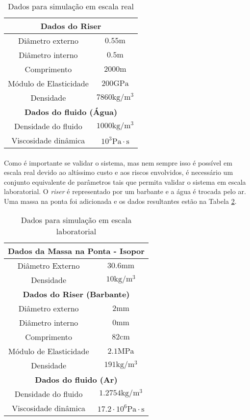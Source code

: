 \begin{table}[!ht]
\centering
\caption{Dados para simulação em escala real\label{escalaReal} \cite{redytton}}
	\begin{tabular}{|c|c|}
	\hline
		\multicolumn{2}{|c|}{\textbf{Dados do Riser}}\\ \hline
		Diâmetro externo & $0.55\mathrm{m}$\\ \hline
		Diâmetro interno & $0.5\mathrm{m}$ \\ \hline
		Comprimento & $2000\mathrm{m}$ \\ \hline
		Módulo de Elasticidade & $200 \mathrm{GPa}$\\ \hline
		Densidade &  $7860\mathrm{kg}/\mathrm{m}^3$\\ \hline
		\multicolumn{2}{|c|}{\textbf{Dados do fluido (Água)}}\\ \hline
		Densidade do fluido &  $1000\mathrm{kg}/\mathrm{m}^3$\\ \hline
		Viscosidade dinâmica & $10^3 \mathrm{Pa}\cdot \mathrm{s}$ \\ \hline
	\end{tabular}
\end{table}

\paragraph{}Como é importante se validar o sistema, mas nem sempre isso é possível em escala real devido ao altíssimo custo e aos riscos envolvidos, é necessário um conjunto equivalente de parâmetros tais que permita validar o sistema em escala laboratorial. O \textit{riser} é representado por um barbante e a água é trocada pelo ar. Uma massa na ponta foi adicionada e os dados resultantes estão na Tabela \ref{escalaLaboratorial}.

\begin{table}[!ht]
\centering
\caption{Dados para simulação em escala laboratorial\label{escalaLaboratorial}}
	\begin{tabular}{|c|c|}
	\hline
		\multicolumn{2}{|c|}{\textbf{Dados da Massa na Ponta - Isopor}} \\ \hline
		Diâmetro Externo & $30.6\mathrm{mm}$\\ \hline
		Densidade & $10\mathrm{kg}/\mathrm{m}^3$ \\ \hline
		\multicolumn{2}{|c|}{\textbf{Dados do Riser (Barbante)}}\\ \hline
		Diâmetro externo & $2\mathrm{mm}$\\ \hline
		Diâmetro interno & $0\mathrm{mm}$ \\ \hline
		Comprimento & $82\mathrm{cm}$ \\ \hline
		Módulo de Elasticidade & $2.1 \mathrm{MPa}$\\ \hline
		Densidade &  $191\mathrm{kg}/\mathrm{m}^3$\\ \hline
		\multicolumn{2}{|c|}{\textbf{Dados do fluido (Ar)}}\\ \hline
		Densidade do fluido &  $1.2754\mathrm{kg}/\mathrm{m}^3$\\ \hline
		Viscosidade dinâmica & $17.2\cdot 10^6 \mathrm{Pa}\cdot \mathrm{s}$ \\ \hline
	\end{tabular}
\end{table}
